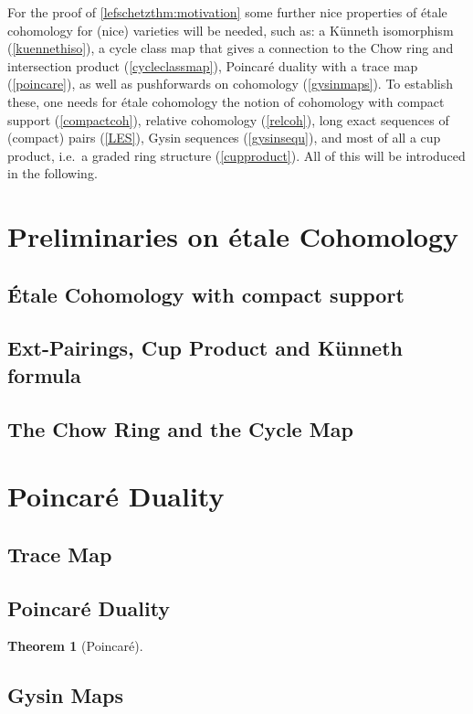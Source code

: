 \documentclass[english]{scrartcl}
\theoremstyle{definition}
\newtheorem{Thm}[Def]{Theorem}
\theoremstyle{remark}
\newcommand*{\idest}{i.e.\ }
\begin{document}
For the proof of \ref{lefschetzthm:motivation}
some further nice properties of étale cohomology for
(nice) varieties will be needed, such as:
a Künneth isomorphism (\autoref{kuennethiso}),
a cycle class map that gives a connection to the Chow ring and
intersection product (\autoref{cycleclassmap}),
Poincaré duality with a trace map (\autoref{poincare}),
as well as pushforwards on cohomology (\autoref{gysinmaps}).
To establish these, one needs for étale cohomology the notion of
cohomology with compact support (\autoref{compactcoh}),
relative cohomology (\autoref{relcoh}),
long exact sequences of (compact) pairs (\autoref{LES}),
Gysin sequences (\autoref{gysinsequ}),
and most of all a cup product, \idest a graded ring structure
(\autoref{cupproduct}).
All of this will be introduced in the following.

\section{Preliminaries on étale Cohomology}

\subsection{Étale Cohomology with compact support}
\subsection{Ext-Pairings, Cup Product and Künneth formula}
\subsection{The Chow Ring and the Cycle Map}

\section{Poincaré Duality}
\subsection{Trace Map}
\subsection{Poincaré Duality}
\begin{Thm}[Poincaré]
  
\end{Thm}
\subsection{Gysin Maps}
\end{document}
